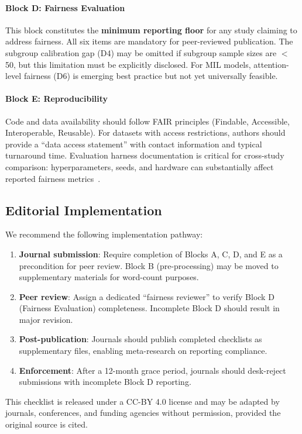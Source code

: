 \paragraph{Block D: Fairness Evaluation}
This block constitutes the \textbf{minimum reporting floor} for any study claiming to address fairness. All six items are mandatory for peer-reviewed publication. The subgroup calibration gap (D4) may be omitted if subgroup sample sizes are $<$50, but this limitation must be explicitly disclosed. For MIL models, attention-level fairness (D6) is emerging best practice but not yet universally feasible.

\paragraph{Block E: Reproducibility}
Code and data availability should follow FAIR principles (Findable, Accessible, Interoperable, Reusable). For datasets with access restrictions, authors should provide a ``data access statement'' with contact information and typical turnaround time. Evaluation harness documentation is critical for cross-study comparison: hyperparameters, seeds, and hardware can substantially affect reported fairness metrics~\citep{zong2023medfair}.

\subsection*{Editorial Implementation}

We recommend the following implementation pathway:

\begin{enumerate}
  \item \textbf{Journal submission}: Require completion of Blocks A, C, D, and E as a precondition for peer review. Block B (pre-processing) may be moved to supplementary materials for word-count purposes.
  
  \item \textbf{Peer review}: Assign a dedicated ``fairness reviewer'' to verify Block D (Fairness Evaluation) completeness. Incomplete Block D should result in major revision.
  
  \item \textbf{Post-publication}: Journals should publish completed checklists as supplementary files, enabling meta-research on reporting compliance.
  
  \item \textbf{Enforcement}: After a 12-month grace period, journals should desk-reject submissions with incomplete Block D reporting.
\end{enumerate}

This checklist is released under a CC-BY 4.0 license and may be adapted by journals, conferences, and funding agencies without permission, provided the original source is cited.
